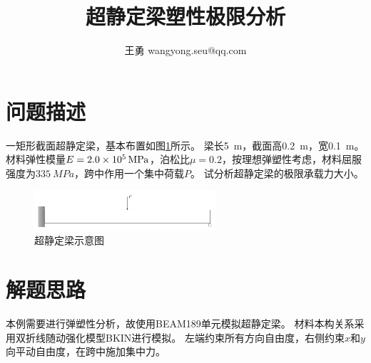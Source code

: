 \documentclass{article}
\title{超静定梁塑性极限分析}
\author{王勇 wangyong.seu@qq.com}
\begin{document}
\maketitle
\section{问题描述}
一矩形截面超静定梁，基本布置如图\ref{fig:beam-diagram}所示。
梁长\SI{5}{m}，截面高\SI{0.2}{m}，宽\SI{0.1}{m}。
材料弹性模量$E=\SI{2.0E5}{MPa}$，泊松比$\mu=0.2$，按理想弹塑性考虑，材料屈服强度为$\SI{335}{MPa}$，跨中作用一个集中荷载$P$。
试分析超静定梁的极限承载力大小。

\begin{figure}[!h]
\centering
\includegraphics[width=0.6\textwidth]{beam_diagram.pdf}
\caption{超静定梁示意图}\label{fig:beam-diagram}
\end{figure}

\section{解题思路}
本例需要进行弹塑性分析，故使用BEAM189单元模拟超静定梁。
材料本构关系采用双折线随动强化模型BKIN进行模拟。
左端约束所有方向自由度，右侧约束$x$和$y$向平动自由度，在跨中施加集中力。
\end{document}
